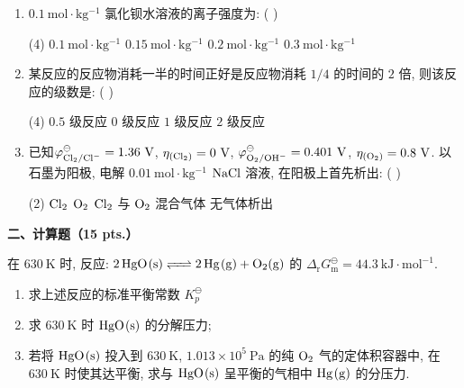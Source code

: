 \begin{enumerate}[label=\arabic*., itemsep=1.5ex]
    以$\ce{2Fe^{3+} + Sn^{2+} = Sn^{4+} + 2Fe^{2+}}$ 反应组成原电池, 其标准电动势 $E^\ominus$ 值为: ( )
    \begin{tasks}(4)
        \task $1.09\ \mathrm{V}$
        \task $0.92\ \mathrm{V}$
        \task $1.39\ \mathrm{V}$
        \task $0.62\ \mathrm{V}$
    \end{tasks}
    \item $0.1\ \mathrm{mol\cdot kg^{-1}}$ 氯化钡水溶液的离子强度为: ( )
    \begin{tasks}(4)
        \task $0.1\ \mathrm{mol\cdot kg^{-1}}$
        \task $0.15\ \mathrm{mol\cdot kg^{-1}}$
        \task $0.2\ \mathrm{mol\cdot kg^{-1}}$
        \task $0.3\ \mathrm{mol\cdot kg^{-1}}$
    \end{tasks}
    \item 某反应的反应物消耗一半的时间正好是反应物消耗 $1/4$ 的时间的 $2$ 倍, 则该反应的级数是: ( )
    \begin{tasks}(4)
        \task $0.5$ 级反应
        \task $0$ 级反应
        \task $1$ 级反应
        \task $2$ 级反应
    \end{tasks}
    \item 已知$\varphi^\ominus_{\ce{Cl_{2}/Cl^{-}}} = 1.36\ \mathrm{V}$, $\eta_{\ce{(Cl_{2})}} = 0\ \mathrm{V}$, $\varphi^\ominus_{\ce{O_{2}/OH^{-}}} = 0.401\ \mathrm{V}$, $\eta_{\ce{(O_{2})}} = 0.8\ \mathrm{V}$. 以石墨为阳极, 电解 $0.01\ \mathrm{mol\cdot kg^{-1}}$ $\ce{NaCl}$ 溶液, 在阳极上首先析出: ( )
    \begin{tasks}(2)
        \task $\ce{Cl_{2}}$
        \task $\ce{O_{2}}$
        \task $\ce{Cl_{2}}$ 与 $\ce{O_{2}}$ 混合气体
        \task 无气体析出
    \end{tasks}
\end{enumerate}

\vspace{0.5cm}
\noindent\textbf{二、计算题（15 pts.）}

在 $630\ \mathrm{K}$ 时, 反应: $\ce{2HgO(s) <=> 2Hg(g) + O_{2}(g)}$ 的 $\Delta_\mathrm{r}G_\mathrm{m}^\ominus = 44.3\ \mathrm{kJ\cdot mol^{-1}}$.
\begin{enumerate}[label=(\arabic*), itemsep=1ex]
    \item 求上述反应的标准平衡常数 $K_p^\ominus$
    \item 求 $630\ \mathrm{K}$ 时 $\ce{HgO(s)}$ 的分解压力;
    \item 若将 $\ce{HgO(s)}$ 投入到 $630\ \mathrm{K}$, $1.013\times10^5\ \mathrm{Pa}$ 的纯 $\ce{O_{2}}$ 气的定体积容器中, 在 $630\ \mathrm{K}$ 时使其达平衡, 求与 $\ce{HgO(s)}$ 呈平衡的气相中 $\ce{Hg(g)}$ 的分压力.
\end{enumerate}

